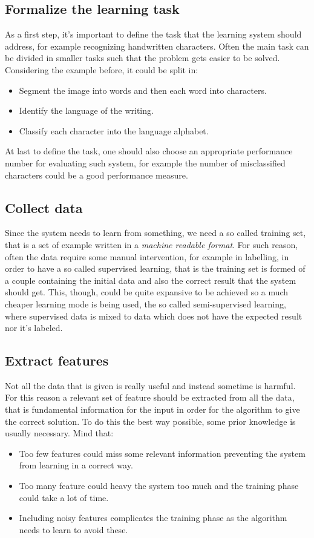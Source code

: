 \subsection{Formalize the learning task}
As a first step, it's important to define the task that the learning system should address, for example recognizing handwritten characters.\newline
Often the main task can be divided in smaller tasks such that the problem gets easier to be solved. Considering the example before, it could be split in:
\begin{itemize}
	\item Segment the image into words and then each word into characters.
	\item Identify the language of the writing.
	\item Classify each character into the language alphabet.
\end{itemize}
At last to define the task, one should also choose an appropriate performance number for evaluating such system, for example the number of misclassified characters could be a good performance measure. 
\subsection{Collect data}
Since the \ml system needs to learn from something, we need a so called training set, that is a set of example written in a \textit{machine readable format}.\newline
For such reason, often the data require some manual intervention, for example in labelling, in order to have a so called supervised learning, that is the training set is formed of a couple containing the initial data and also the correct result that the system should get. This, though, could be quite expansive to be achieved so a much cheaper learning mode is being used, the so called semi-supervised learning, where supervised data is mixed to data which does not have the expected result nor it's labeled. 
\subsection{Extract features}
Not all the data that is given is really useful and instead sometime is harmful. For this reason a relevant set of feature should be extracted from all the data, that is fundamental information for the input in order for the algorithm to give the correct solution. To do this the best way possible, some prior knowledge is usually necessary. \newline
Mind that:
\begin{itemize}
	\item Too few features could miss some relevant information preventing the system from learning in a correct way.
	\item Too many feature could heavy the system too much and the training phase could take a lot of time.
	\item Including noisy features complicates the training phase as the algorithm needs to learn to avoid these. 
\end{itemize}

